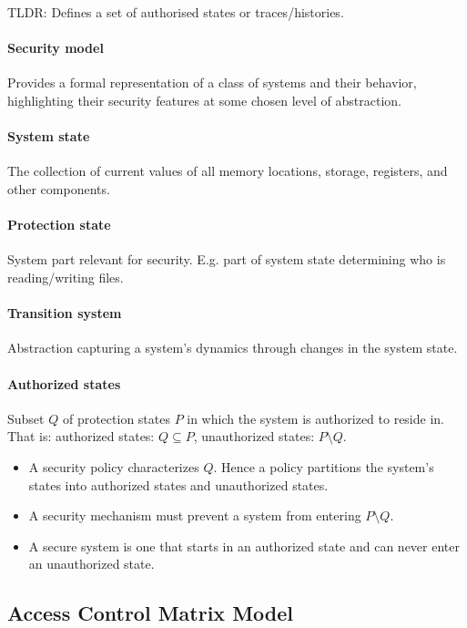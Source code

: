 TLDR: Defines a set of authorised states or traces/histories.

\paragraph{Security model} Provides a formal representation of a class of systems and their behavior, highlighting their security features at some chosen level of abstraction.

\paragraph{System state} The collection of current values of all memory locations, storage, registers, and other components.

\paragraph{Protection state} System part relevant for security. E.g. part of system state determining who is reading/writing files.

\paragraph{Transition system} Abstraction capturing a system’s dynamics through changes in the system state.

\paragraph{Authorized states} Subset $Q$ of protection states $P$ in which the system is authorized to reside in. That is: authorized states: $Q \subseteq P$, unauthorized states: $P \setminus Q$.

\begin{itemize}
    \item A security policy characterizes $Q$. Hence a policy partitions the system’s states into authorized states and unauthorized states.
    \item A security mechanism must prevent a system from entering $P \setminus Q$.
    \item A secure system is one that starts in an authorized state and can never enter an unauthorized state.
\end{itemize}


\subsection{Access Control Matrix Model}

